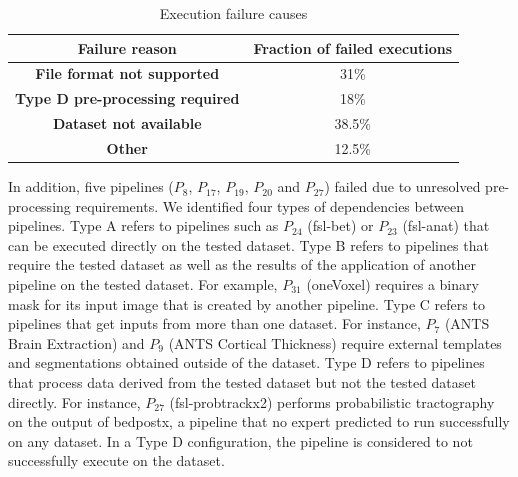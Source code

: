 \begin{table}[htbp]
    \caption{Execution failure causes}
    \begin{center}
        \begin{tabular}{cc}
            \hline
            \textbf{Failure reason} & \textbf{Fraction of failed executions}  \\
            \hline
            \textbf{File format not supported}    & 31\% \\
            \textbf{Type D pre-processing required}    & 18\% \\
            \textbf{Dataset not available}         & 38.5\% \\
            \textbf{Other}       & 12.5\% \\
            \hline
        \end{tabular}
        \label{tab1}
    \end{center}
\end{table}

In addition, five pipelines ($P_{8}$, $P_{17}$, $P_{19}$, $P_{20}$ and
$P_{27}$) failed due to unresolved pre-processing requirements. We
identified four types of dependencies between pipelines. Type A refers to pipelines such
as $P_{24}$ (fsl-bet) or $P_{23}$ (fsl-anat) that can be executed directly
on the tested dataset. Type B refers to pipelines that require the tested
dataset as well as the results of the application of another pipeline on
the tested dataset. For example, $P_{31}$ (oneVoxel) requires a binary mask
for its input image that is created by another pipeline. Type C refers
to pipelines that get inputs from more than one dataset. For instance, $P_7$
(ANTS Brain Extraction) and $P_9$ (ANTS Cortical Thickness) require
external templates and segmentations obtained outside of the dataset. Type
D refers to pipelines that process data derived from the tested dataset but not
the tested dataset directly.  For instance, $P_{27}$ (fsl-probtrackx2) performs
probabilistic tractography on the output of bedpostx, a pipeline that
no expert predicted to run successfully on any dataset. In a Type D
configuration, the pipeline is considered to not successfully execute on
the dataset. 

